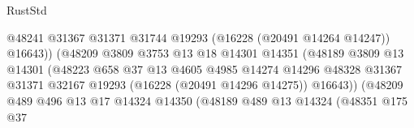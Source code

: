 \begin{lexlean}{RustStd}
\begin{coremodule}
                                                @48241
                                                @31367
                                                @31371
                                                @31744
                                                @19293
                                                (@16228 (@20491 @14264 @14247))
                                                @16643))
                                            (@48209
                                              @3809
                                              @3753
                                              @13
                                              @18
                                              @14301
                                              @14351
                                              (@48189
                                                @3809
                                                @13
                                                @14301
                                                (@48223
                                                  @658
                                                  @37
                                                  @13
                                                  @4605
                                                  @4985
                                                  @14274
                                                  @14296
                                                  @48328
                                                  @31367
                                                  @31371
                                                  @32167
                                                  @19293
                                                  (@16228 (@20491 @14296 @14275))
                                                  @16643))
                                              (@48209
                                                @489
                                                @496
                                                @13
                                                @17
                                                @14324
                                                @14350
                                                (@48189
                                                  @489
                                                  @13
                                                  @14324
                                                  (@48351
                                                    @175
                                                    @37

\end{coremodule}
\end{lexlean}
